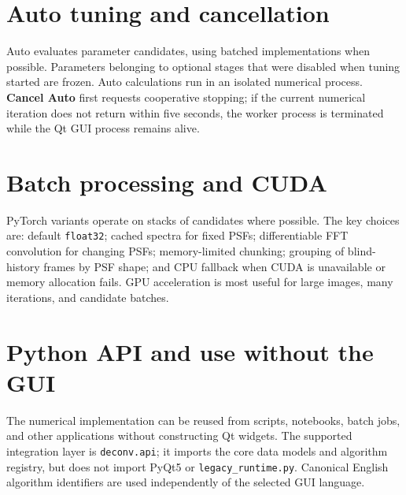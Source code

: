 \documentclass[10pt,a4paper]{article}
\newcommand{\code}[1]{\texttt{#1}}
\begin{document}
\section{Auto tuning and cancellation}
Auto evaluates parameter candidates, using batched implementations when possible. Parameters belonging to optional stages that were disabled when tuning started are frozen. Auto calculations run in an isolated numerical process. \textbf{Cancel Auto} first requests cooperative stopping; if the current numerical iteration does not return within five seconds, the worker process is terminated while the Qt GUI process remains alive.

\section{Batch processing and CUDA}
PyTorch variants operate on stacks of candidates where possible. The key choices are: default \code{float32}; cached spectra for fixed PSFs; differentiable FFT convolution for changing PSFs; memory-limited chunking; grouping of blind-history frames by PSF shape; and CPU fallback when CUDA is unavailable or memory allocation fails. GPU acceleration is most useful for large images, many iterations, and candidate batches.


\section{Python API and use without the GUI}
The numerical implementation can be reused from scripts, notebooks, batch jobs, and other applications without constructing Qt widgets.  The supported integration layer is \code{deconv.api}; it imports the core data models and algorithm registry, but does not import PyQt5 or \code{legacy\_runtime.py}.  Canonical English algorithm identifiers are used independently of the selected GUI language.
\end{document}

